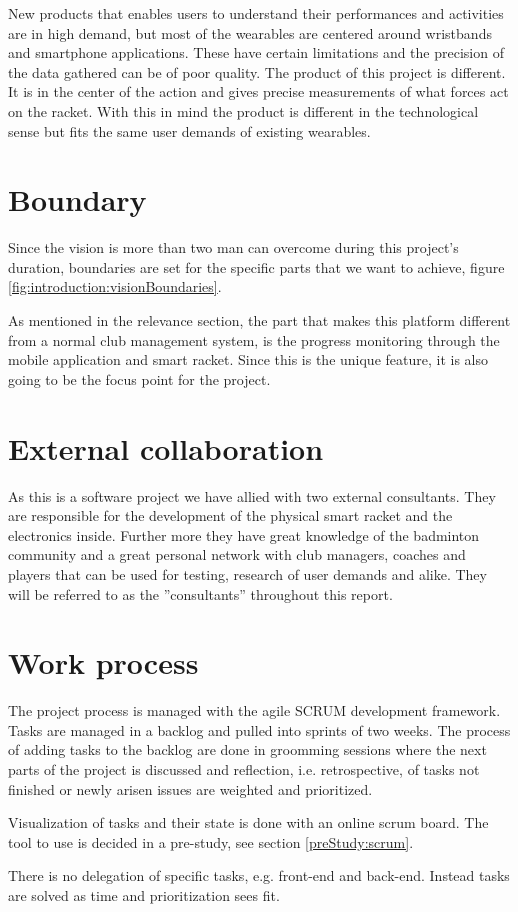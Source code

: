 New products that enables users to understand their performances and activities are in high demand, but most of the wearables are centered around wristbands and smartphone applications.
These have certain limitations and the precision of the data gathered can be of poor quality.
The product of this project is different.
It is in the center of the action and gives precise measurements of what forces act on the racket.
With this in mind the product is different in the technological sense but fits the same user demands of existing wearables.

\section*{Boundary}
Since the vision is more than two man can overcome during this project's duration, boundaries are set for the specific parts that we want to achieve, figure \ref{fig:introduction:visionBoundaries}.

As mentioned in the relevance section, the part that makes this platform different from a normal club management system, is the progress monitoring through the mobile application and smart racket.
Since this is the unique feature, it is also going to be the focus point for the project.


\section*{External collaboration}
As this is a software project we have allied with two external consultants.
They are responsible for the development of the physical smart racket and the electronics inside.
Further more they have great knowledge of the badminton community and a great personal network with club managers, coaches and players that can be used for testing, research of user demands and alike.
They will be referred to as the ''consultants'' throughout this report.

\section*{Work process}
The project process is managed with the agile SCRUM development framework.
Tasks are managed in a backlog and pulled into sprints of two weeks.
The process of adding tasks to the backlog are done in groomming sessions where the next parts of the project is discussed and reflection, i.e. retrospective, of tasks not finished or newly arisen issues are weighted and prioritized.

Visualization of tasks and their state is done with an online scrum board.
The tool to use is decided in a pre-study, see section \ref{preStudy:scrum}.

There is no delegation of specific tasks, e.g. front-end and back-end.
Instead tasks are solved as time and prioritization sees fit.
